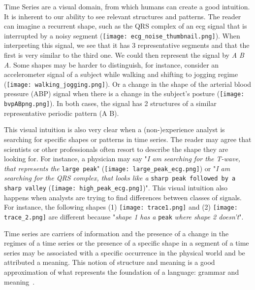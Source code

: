 Time Series are a visual domain, from which humans can create a good intuition. It is inherent to our ability to see relevant structures and patterns. The reader can imagine a recurrent shape, such as the \textcolor{myblue}{QRS complex} of an \gls{ecg} signal that is interrupted by a \textcolor{myred}{noisy} segment (\texttt{[image: ecg\_noise\_thumbnail.png]}). When interpreting this signal, we see that it has 3 representative segments and that the first is very similar to the third one. We could then represent the signal by \textit{\textcolor{myblue}{A} \textcolor{myred}{B} \textcolor{myblue}{A}}. Some shapes may be harder to distinguish, for instance, consider an accelerometer signal of a subject while \textcolor{myblue}{walking} and shifting to \textcolor{mygreen}{jogging} regime (\texttt{[image: walking\_jogging.png]}). Or a change in the shape of the arterial blood pressure (ABP) signal when there is a change in the subject's posture (\texttt{[image: bvpABpng.png]}). In both cases, the signal has 2 structures of a similar representative periodic pattern (\textcolor{myblue}{A} \textcolor{mygreen}{B}).

This visual intuition is also very clear when a (non-)experience analyst is searching for specific shapes or patterns in time series. The reader may agree that scientists or other professionals often resort to describe the shape they are looking for. For instance, a physician may say "\textit{I am searching for the T-wave, that represents the} \texttt{large peak}" (\texttt{[image: large\_peak\_ecg.png]}) or "\textit{I am searching for the QRS complex, that looks like a} \texttt{sharp peak followed by a sharp valley} (\texttt{[image: high\_peak\_ecg.png]})". This visual intuition also happens when analysts are trying to find differences between classes of signals. For instance, the following shapes (1) \texttt{[image: trace1.png]} and (2) \texttt{[image: trace\_2.png]} are different because "\textit{shape 1 has a} \texttt{peak} \textit{where shape 2 doesn't}". 

Time series are carriers of information and the presence of a change in the regimes of a time series or the presence of a specific shape in a segment of a time series may be associated with a specific occurrence in the physical world and be attributed a meaning. This notion of structure and meaning is a good approximation of what represents the foundation of a language: grammar and meaning~\cite{grammar}.

